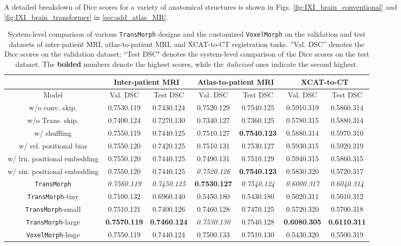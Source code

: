 \documentclass[times,twocolumn,final]{elsarticle}
\begin{document}
A detailed breakdown of Dice scores for a variety of anatomical structures is shown in Figs. \ref{fig:IXI_brain_conventional} and \ref{fig:IXI_brain_transformer} in \ref{sec:add_atlas_MR}.
\begin{table*}[!t]
\fontsize{10}{11}\selectfont
\caption{System-level comparison of various \texttt{TransMorph} designs and the customized \texttt{VoxelMorph} on the validation and test datasets of inter-patient MRI, atlas-to-patient MRI, and XCAT-to-CT registration tasks. ”Val. DSC” denotes the Dice scores on the validation dataset; ``Test DSC" denotes the system-level comparison of the Dice scores on the test dataset. The \textbf{bolded} numbers denote the highest scores, while the \textit{italicized} ones indicate the second highest.}
\centering
    \begin{tabular}{ c || c | c | c | c | c | c }
 \hline
  & \multicolumn{2}{c|}{Inter-patient MRI} & \multicolumn{2}{c|}{Atlas-to-patient MRI} & \multicolumn{2}{c}{XCAT-to-CT} \\
 \hline
 Model & Val. DSC & Test DSC & Val. DSC & Test DSC & Val. DSC & Test DSC\\
 \hline
 w/o conv. skip.& 0.7530.119 & 0.7430.124 & 0.7520.129 & 0.7540.125 & 0.5910.319 & 0.5860.314\\
 \hline
 w/o Trans. skip. & 0.7400.124 & 0.7270.130  & 0.7340.127 & 0.7360.125 & 0.5780.315 & 0.5880.314\\
 \hline
 w/ shuffling & 0.7550.119 & 0.7440.125 & 0.7510.127 & \textbf{0.7540.123} & 0.5880.314 & 0.5970.310\\
 \hline
 w/ rel. positional bias & 0.7550.120 & 0.7420.125& 0.7510.131 & 0.7530.127 & 0.5930.315 & 0.5920.319\\
 \hline
 w/ lrn. positional embedding & 0.7550.120 & 0.7440.125 & 0.7490.131 & 0.7510.129 & 0.5940.315 & 0.5860.315\\
 \hline
 w/ sin. positional embedding & 0.7550.120 & 0.7440.125  & \textit{0.7520.126} & \textbf{0.7540.123} & 0.5830.320 & 0.5720.317\\
 \hline
 \hline
 \texttt{TransMorph}& \textit{0.7560.119} & \textit{0.7450.125}& \textbf{0.7530.127} & \textit{0.7540.124} & \textit{0.6000.317} & \textit{0.6040.314}\\
 \hline
 \texttt{TransMorph}-tiny & 0.7100.132 & 0.6960.140 &0.5450.180 & 0.5430.180 & 0.5020.311 & 0.5010.312\\
 \hline
 \texttt{TransMorph}-small & 0.7510.121 & 0.7400.126  & 0.7460.128 & 0.7470.125 & 0.5720.320 & 0.5700.318\\
 \hline
 \texttt{TransMorph}-large & \textbf{0.7570.119}& \textbf{0.7460.124}  & \textit{0.7530.130} & 0.7540.128 & \textbf{0.6080.305} & \textbf{0.6110.311}\\
 \hline
 \texttt{VoxelMorph}-huge & 0.7550.119& 0.7440.124  & 0.7500.133 & 0.7510.130 & 0.5430.320 &  0.5500.319 \\
 \hline
\end{tabular}
\label{tab:table_ablation_sys}
\end{table*}
\end{document}
